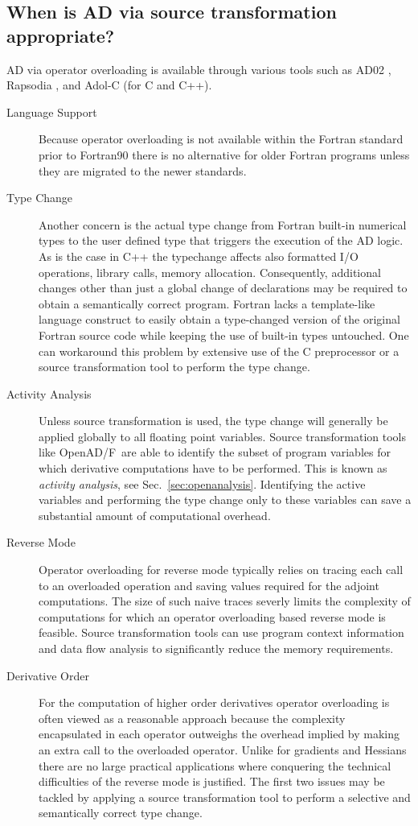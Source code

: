 \documentclass{book}
\newcommand{\OpenADF}{OpenAD/F}
\newcommand{\refsec}[1]{{Sec.~\ref{#1}}}
\begin{document}
\subsection{When is AD via source transformation appropriate?}\label{sec:sourceTransformApprop}
AD via operator overloading is available through various tools such as 
AD02 \cite{ad02}, Rapsodia \cite{rapsodiaWeb}, and Adol-C \cite{adolcWeb} (for C and C++). 
\begin{description}
\item[Language Support]
Because operator overloading is not available within the Fortran standard prior to Fortran90 
there is no alternative for older Fortran programs unless they are migrated to the newer standards.
\item[Type Change]
Another concern is the actual type change from Fortran built-in numerical types to 
the user defined type that triggers the execution of the AD logic. 
As is the case in C++ the typechange affects also formatted I/O operations, 
library calls, memory allocation. Consequently, additional changes other than just a global 
change of declarations may be required to obtain a semantically correct program. 
Fortran lacks a template-like language construct to easily obtain 
a type-changed version of the original Fortran source code while keeping 
the use of built-in types untouched.
One can  workaround this problem  by extensive use of 
the C preprocessor or a source transformation tool to perform the type change. 
\item[Activity Analysis] 
Unless source transformation is used, the type change will generally be applied globally to all 
floating point variables. Source transformation tools like \OpenADF\ are able to identify 
the subset of program variables for which derivative computations have to be performed. 
This is known as {\em activity analysis}, see \refsec{sec:openanalysis}. 
Identifying the active variables and performing the type change only to these variables 
can save a substantial amount of computational overhead.
\item[Reverse Mode]
Operator overloading for reverse mode typically relies on tracing each call  
to an  overloaded operation and saving values required for the adjoint computations.
The size of such naive traces severly limits the complexity of computations
for which an operator overloading based reverse mode is feasible.  
Source transformation tools can use program context information and data flow analysis 
to significantly reduce the memory requirements.      
\item[Derivative Order]
For the computation of higher order derivatives operator overloading is often 
viewed as a reasonable approach because the complexity encapsulated in each operator 
outweighs the overhead implied by making an extra call to the overloaded operator.
Unlike for gradients and Hessians there are no large practical applications where 
conquering the technical difficulties of the reverse mode is justified. 
The first two issues may be tackled by applying a source transformation tool to 
perform a selective and semantically correct type change. 
\end{description}
\end{document}
